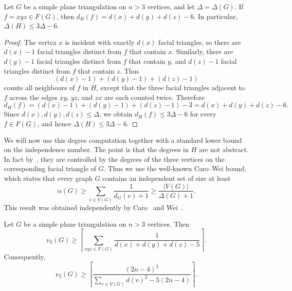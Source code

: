 \documentclass{patmorin}
\begin{document}
\begin{lem}\label{lem:deg_H}
Let $G$ be a simple plane triangulation on $n>3$ vertices, and let
$\Delta=\Delta(G)$. If $f=xyz\in F(G)$, then $d_H(f)=d(x)+d(y)+d(z)-6$.
In particular, $\Delta(H)\le 3\Delta-6$.
\end{lem}

\begin{proof}
The vertex $x$ is incident with exactly $d(x)$ facial triangles, so there are
$d(x)-1$ facial triangles distinct from $f$ that contain $x$. Similarly, there
are $d(y)-1$ facial triangles distinct from $f$ that contain $y$, and
$d(z)-1$ facial triangles distinct from $f$ that contain $z$. Thus
\[
(d(x)-1)+(d(y)-1)+(d(z)-1)
\]
counts all neighbours of $f$ in $H$, except that the three facial triangles
adjacent to $f$ across the edges $xy$, $yz$, and $zx$ are each counted twice.
Therefore
\[
d_H(f)=(d(x)-1)+(d(y)-1)+(d(z)-1)-3
=d(x)+d(y)+d(z)-6.
\]
Since $d(x),d(y),d(z)\le \Delta$, we obtain $d_H(f)\le 3\Delta-6$
for every $f\in F(G)$, and hence $\Delta(H)\le 3\Delta-6$.
\end{proof}
We will now use this degree computation together with a standard lower bound on the independence number. The point is that the degrees in $H$ are not abstract.
In fact by~, they are controlled by the degrees of the three vertices on the corresponding facial triangle of $G$.
Thus we use the well-known Caro--Wei bound, which states that every graph $G$ contains an independent set of size at least
\begin{equation}\label{caro}
\alpha(G) \ge \sum_{v \in V(G)} \frac{1}{d_G(v)+1}\ge \frac{|V(G)|}{\Delta(G)+1}.
\end{equation}
This result was obtained independently by Caro~\cite{Caro1979} and Wei~\cite{Wei1981}.

\begin{thm}\label{thm:degree-sensitive-k3-packing}
Let $G$ be a simple plane triangulation on $n>3$ vertices. Then
\[
\nu_3(G)\ge
\left\lceil
\sum_{xyz\in F(G)}
\frac{1}{d(x)+d(y)+d(z)-5}
\right\rceil .
\]
Consequently,
\[
\nu_3(G)\ge
\left\lceil
\frac{(2n-4)^2}
{\sum_{v\in V(G)}d(v)^2-5(2n-4)}
\right\rceil .
\]
\end{thm}
\end{document}
